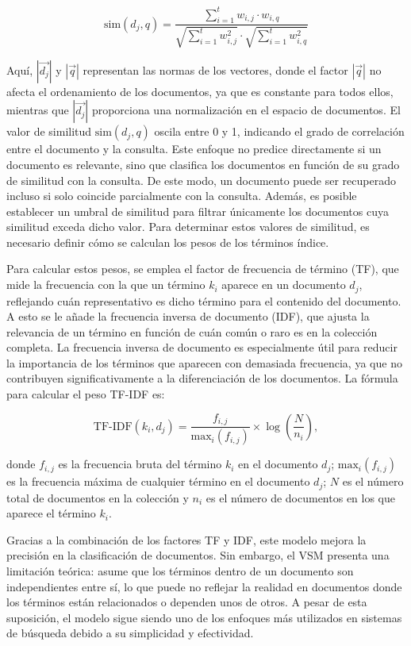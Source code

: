 \[
\text{sim}(d_j, q) = \frac{\sum_{i=1}^t w_{i,j} \cdot w_{i,q}}{\sqrt{\sum_{i=1}^t w_{i,j}^2} \cdot \sqrt{\sum_{i=1}^t w_{i,q}^2}}
\]

Aquí, \( |\vec{d_j}| \) y \( |\vec{q}| \) representan las normas de los vectores, 
donde el factor \( |\vec{q}| \) no afecta el ordenamiento de los documentos, 
ya que es constante para todos ellos, mientras que \( |\vec{d_j}| \) proporciona 
una normalización en el espacio de documentos. El valor de similitud \( \text{sim}(d_j, q) \) 
oscila entre 0 y 1, indicando el grado de correlación entre el documento y la consulta. 
Este enfoque no predice directamente si un documento es relevante, sino que clasifica 
los documentos en función de su grado de similitud con la consulta. De este modo, 
un documento puede ser recuperado incluso si solo coincide parcialmente con la consulta. 
Además, es posible establecer un umbral de similitud para filtrar únicamente los documentos 
cuya similitud exceda dicho valor. Para determinar estos valores de similitud, 
es necesario definir cómo se calculan los pesos de los términos índice.

Para calcular estos pesos, se emplea el factor de frecuencia de término (TF), 
que mide la frecuencia con la que un término \( k_i \) aparece en un documento \( d_j \), 
reflejando cuán representativo es dicho término para el contenido del documento. 
A esto se le añade la frecuencia inversa de documento (IDF), que ajusta la relevancia 
de un término en función de cuán común o raro es en la colección completa. 
La frecuencia inversa de documento es especialmente útil para reducir la importancia 
de los términos que aparecen con demasiada frecuencia, ya que no contribuyen 
significativamente a la diferenciación de los documentos. La fórmula para 
calcular el peso TF-IDF es:

\[
\text{TF-IDF}(k_i, d_j) = \frac{f_{i,j}}{\text{max}_i(f_{i,j})} \times \log \left( \frac{N}{n_i} \right),
\]

donde \( f_{i,j} \) es la frecuencia bruta del término \( k_i \) en el documento \( d_j \); 
\( \text{max}_i(f_{i,j}) \) es la frecuencia máxima de cualquier término en el documento 
\( d_j \); \( N \) es el número total de documentos en la colección y \( n_i \) 
es el número de documentos en los que aparece el término \( k_i \).

Gracias a la combinación de los factores TF y IDF, este modelo mejora la precisión 
en la clasificación de documentos. Sin embargo, el VSM presenta una limitación teórica: 
asume que los términos dentro de un documento son independientes entre sí, 
lo que puede no reflejar la realidad en documentos donde los términos están relacionados 
o dependen unos de otros. A pesar de esta suposición, el modelo sigue siendo uno de 
los enfoques más utilizados en sistemas de búsqueda debido a su simplicidad y efectividad.

